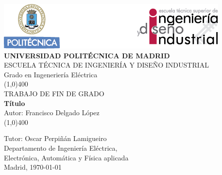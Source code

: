 \begin{center}
\thispagestyle{empty}
\includegraphics[scale=1]{figuras/cabecera.png}\\
\vspace*{1cm}
\Large{\textbf{\MakeUppercase{Universidad Politécnica de Madrid}}}\\[3mm]
\Large{{\MakeUppercase{Escuela técnica de ingeniería y diseño industrial}}}\\[3mm]
\Large {Grado en Ingeneriería Eléctrica}\\
\vfill
\line(1,0){400}\\
\Large{{\MakeUppercase{Trabajo de fin de grado}}}\\
\Huge{\textbf{Título}}\\[5mm]
\Large{Autor: Francisco Delgado López}\\
\line(1,0){400}\\
\vfill
\end{center}
\begin{flushright}
\Large {Tutor: Oscar Perpiñán Lamigueiro}\\[3mm]
\Large{Departamento de Ingeniería Eléctrica,\\ Electrónica, Automática y Física aplicada}\\[10mm]
Madrid, \today
\end{flushright}
\cleardoublepage 
